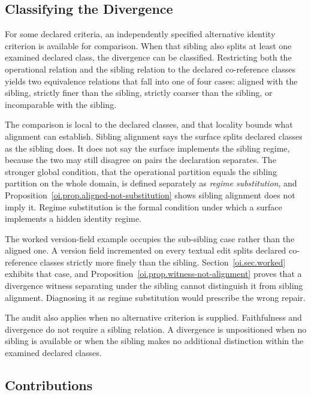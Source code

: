 \documentclass[11pt]{article}
\theoremstyle{plain}
\theoremstyle{definition}
\theoremstyle{remark}
\begin{document}
\subsection{Classifying the Divergence}

For some declared criteria, an independently specified
alternative identity criterion is available for comparison.
When that sibling also splits at least one examined declared class,
the divergence can be classified.
Restricting both the operational relation and the sibling relation
to the declared co-reference classes yields two equivalence relations
that fall into one of four cases:
aligned with the sibling,
strictly finer than the sibling,
strictly coarser than the sibling,
or incomparable with the sibling.

The comparison is local to the declared classes,
and that locality bounds what alignment can establish.
Sibling alignment says the surface splits declared classes as the sibling does.
It does not say the surface implements the sibling regime,
because the two may still disagree on pairs the declaration separates.
The stronger global condition,
that the operational partition equals the sibling partition on the whole domain,
is defined separately as \emph{regime substitution},
and Proposition~\ref{oi.prop.aligned-not-substitution}
shows sibling alignment does not imply it.
Regime substitution is the formal condition under which
a surface implements a hidden identity regime.

The worked version-field example occupies
the sub-sibling case rather than the aligned one.
A version field incremented on every textual edit
splits declared co-reference classes strictly more finely than the sibling.
Section~\ref{oi.sec.worked} exhibits that case,
and Proposition~\ref{oi.prop.witness-not-alignment}
proves that a divergence witness separating under the sibling
cannot distinguish it from sibling alignment.
Diagnosing it as regime substitution would prescribe the wrong repair.

The audit also applies when no alternative criterion is supplied.
Faithfulness and divergence do not require a sibling relation.
A divergence is unpositioned when no sibling is available
or when the sibling makes no additional distinction
within the examined declared classes.

\subsection{Contributions}
\end{document}

